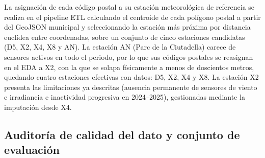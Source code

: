\documentclass[12pt, a4paper]{article}
\begin{document}
La asignación de cada código postal a su estación meteorológica de referencia se realiza en el pipeline ETL calculando el centroide de cada polígono postal a partir del GeoJSON municipal y seleccionando la estación más próxima por distancia euclídea entre coordenadas, sobre un conjunto de cinco estaciones candidatas (D5, X2, X4, X8 y AN). La estación AN (Parc de la Ciutadella) carece de sensores activos en todo el periodo, por lo que sus códigos postales se reasignan en el EDA a X2, con la que se solapa físicamente a menos de doscientos metros, quedando cuatro estaciones efectivas con datos: D5, X2, X4 y X8. La estación X2 presenta las limitaciones ya descritas (ausencia permanente de sensores de viento e irradiancia e inactividad progresiva en 2024--2025), gestionadas mediante la imputación desde X4.

\subsection{Auditoría de calidad del dato y conjunto de evaluación}
\end{document}
